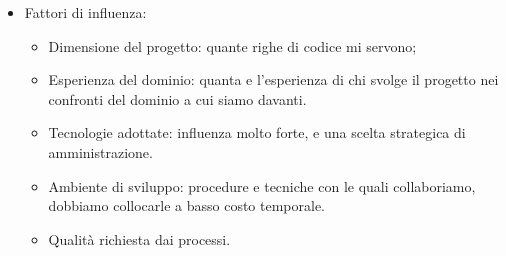 \documentclass[a4paper,10pt] {article}
\begin{document}
\begin{itemize}
\begin{itemize}
\begin{itemize}
\item Fattori di influenza:
\begin{itemize}
	
	\item Dimensione del progetto: quante righe di codice mi servono; 
	
    \item Esperienza del dominio: quanta e l'esperienza di chi svolge il 
    progetto nei confronti del dominio a cui siamo davanti.
    
	\item Tecnologie adottate: influenza molto forte, e una scelta strategica 
	di amministrazione.
	
	\item Ambiente di sviluppo: procedure e tecniche con le quali collaboriamo, 
	dobbiamo collocarle a basso costo temporale.

 	\item Qualità richiesta dai processi.
 	
\end{itemize}

\end{itemize}
\end{itemize}
\end{itemize}
\end{document}
